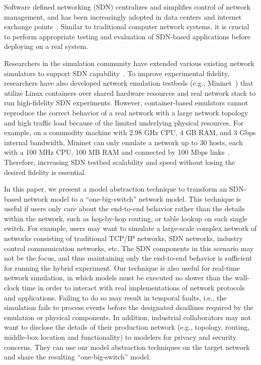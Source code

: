 
Software defined networking (SDN) centralizes and simplifies control of network management,
and has been increasingly adopted in data centers and internet exchange points~\cite{B4, Meridian, SDX}.
Similar to traditional computer network systems, it is crucial to perform appropriate testing and evaluation of
SDN-based applications before deploying on a real system.

Researchers in the simulation community have extended various existing network simulators to support SDN capability~\cite{S3F, NS3, OPNET}.
To improve experimental fidelity, researchers have also developed network emulation testbeds
(e.g., Mininet~\cite{Mininet}) that utilize Linux containers over shared hardware resources and
real network stack to run high-fidelity SDN experiments.
However, container-based emulators cannot reproduce the correct behavior of a real network
with a large network topology and high traffic load because of the limited underlying physical resources.
For example, on a commodity machine with 2.98 GHz CPU, 4 GB RAM, and 3 Gbps internal bandwidth,
Mininet can only emulate a network up to 30 hosts, each with a 100 MHz CPU, 100 MB RAM and connected by 100 Mbps links~\cite{ReproNetExprCBE}.
Therefore, increasing SDN testbed scalability and speed without losing the desired fidelity is essential.

In this paper, we present a model abstraction technique to transform an SDN-based network model to a ``one-big-switch'' network model.
This technique is useful if users only care about the end-to-end behavior rather than
the details within the network, such as hop-by-hop routing, or table lookup on each single switch.
For example, users may want to simulate a large-scale complex network of networks consisting of traditional TCP/IP networks,
SDN networks, industry control communication networks, etc.
The SDN components in this scenario may not be the focus, and thus maintaining only the end-to-end behavior is sufficient for running the hybrid experiment.
Our technique is also useful for real-time network simulation, in which models must be executed
no slower than the wall-clock time in order to interact with real implementations of network protocols and applications.
Failing to do so may result in temporal faults, i.e., the simulation fails to process events before the designated deadlines
required by the emulation or physical components. 
In addition, industrial collaborators may not want to disclose the details of their production network
(e.g., topology, routing, middle-box location and functionality) to modelers for privacy and security concerns.
They can use our model abstraction techniques on the target network and share the resulting ``one-big-switch'' model.

